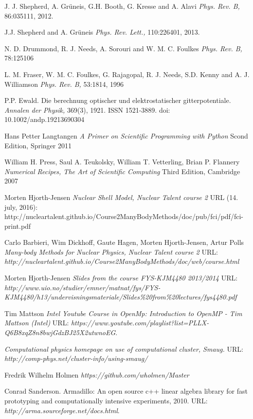 \documentclass[twoside,english]{uiofysmaster}
\begin{document}
\begin{thebibliography}{9}
	J. J. Shepherd, A. Grüneis, G.H. Booth, G. Kresse and A. Alavi 
	\textit{Phys. Rev. B,} 86:035111, 2012.

	J.J. Shepherd and A. Grüneis
	\textit{Phys. Rev. Lett.,} 110:226401, 2013.

	N. D. Drummond, R. J. Needs, A. Sorouri and W. M. C. Foulkes
	\textit{Phys. Rev. B,} 78:125106

	L. M. Fraser, W. M. C. Foulkes, G. Rajagopal, R. J. Needs, S.D. Kenny and A. J. Williamson
	\textit{Phys. Rev. B,} 53:1814, 1996

	P.P. Ewald. Die berechnung optischer und elektrostatischer gitterpotentiale. 
	\textit{Annalen der Physik,} 369(3), 1921. ISSN 1521-3889. doi: 10.1002/andp.19213690304

	Hans Petter Langtangen
	\textit{A Primer on Scientific Programming with Python} Scond Edition, Springer 2011

	William H. Press, Saul A. Teukolsky, William T. Vetterling, Brian P. Flannery
	\textit{Numerical Recipes, The Art of Scientific Computing} Third Edition, Cambridge 2007

	Morten Hjorth-Jensen
	\textit{Nuclear Shell Model, Nuclear Talent course 2} 
	URL (14. july, 2016): http://nucleartalent.github.io/Course2ManyBodyMethods/doc/pub/fci/pdf/fci-print.pdf

	Carlo Barbieri, Wim Dickhoff, Gaute Hagen, Morten Hjorth-Jensen, Artur Polls
	\textit{Many-body Methods for Nuclear Physics, Nuclear Talent course 2} 
	URL: \textit{http://nucleartalent.github.io/Course2ManyBodyMethods/doc/web/course.html}

	Morten Hjorth-Jensen
	\textit{Slides from the course FYS-KJM4480 2013/2014}
	URL: \textit{http://www.uio.no/studier/emner/matnat/fys/FYS-KJM4480/h13/undervisningsmateriale/Slides\%20from\%20lectures/fys4480.pdf}

	Tim Mattson
	\textit{Intel Youtube Course in OpenMp: Introduction to OpenMP - Tim Mattson (Intel)}
	URL: \textit{https://www.youtube.com/playlist?list=PLLX-Q6B8xqZ8n8bwjGdzBJ25X2utwnoEG}.

	\textit{Computational physics homepage on use of computational cluster, Smaug.}
	URL: \textit{http://comp-phys.net/cluster-info/using-smaug/}

	Fredrik Wilhelm Holmen
	\textit{https://github.com/wholmen/Master} 

	Conrad Sanderson. Armadillo: An open source c++ linear algebra library for fast prototyping and computationally intensive experiments, 2010.
	URL: \textit{http://arma.sourceforge.net/docs.html}.

\end{thebibliography}
\end{document}
